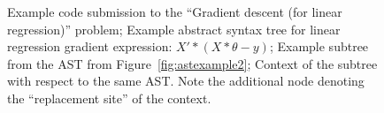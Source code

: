 \begin{figure}[t!]
\center
{}

\caption{
 Example code submission to the ``Gradient descent (for linear regression)'' problem;
 Example abstract syntax tree for linear regression gradient expression: $X'*(X*\theta - y)$;
 Example subtree from the AST from Figure~\ref{fig:astexample2};  
Context of the subtree with respect to the same AST.  Note the additional node denoting the ``replacement site'' of the context.
}
\end{figure}



